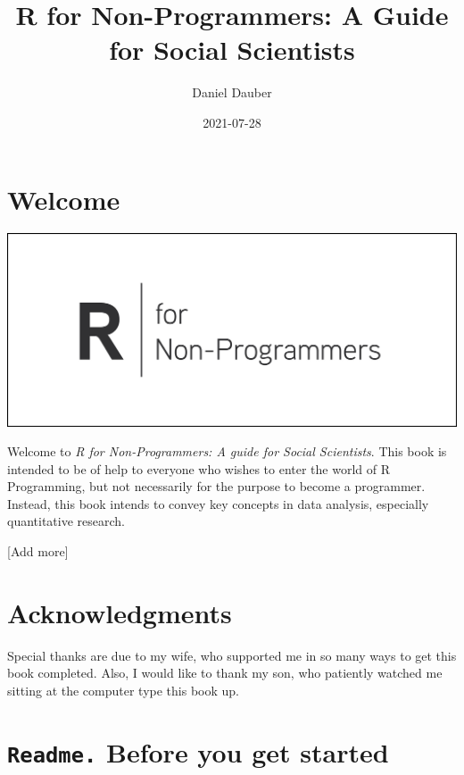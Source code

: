 \documentclass[
]{book}
\title{R for Non-Programmers: A Guide for Social Scientists}
\author{Daniel Dauber}
\date{2021-07-28}
\begin{document}
\maketitle

{
\setcounter{tocdepth}{1}
\tableofcontents
}
\hypertarget{welcome}{%
\chapter*{Welcome 👋}\label{welcome}}

\includegraphics{images/chapter_00_img/r_for_non_programmers_logo.png}

Welcome to \emph{R for Non-Programmers: A guide for Social Scientists}. This book is intended to be of help to everyone who wishes to enter the world of R Programming, but not necessarily for the purpose to become a programmer. Instead, this book intends to convey key concepts in data analysis, especially quantitative research.

{[}Add more{]}

\hypertarget{acknowledgments}{%
\chapter*{Acknowledgments 🙏}\label{acknowledgments}}

Special thanks are due to my wife, who supported me in so many ways to get this book completed. Also, I would like to thank my son, who patiently watched me sitting at the computer type this book up.

\hypertarget{readme-before-you-get-started}{%
\chapter{\texorpdfstring{\texttt{Readme.} Before you get started}{Readme. Before you get started}}\label{readme-before-you-get-started}}
\end{document}
